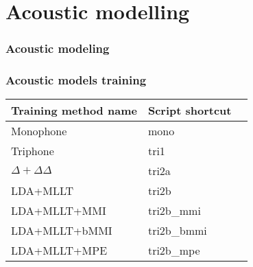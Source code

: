 \section{Acoustic modelling} %

\begin{frame}\frametitle{Acoustic modeling} 
    
\end{frame}

\begin{frame}\frametitle{Acoustic models training} 
    \begin{center}
        
        \small{\begin{tabular}{lll}
        \hline
        Training method name & Script shortcut \\
        \hline
        Monophone & mono \\
        Triphone  & tri1 \\
        $\Delta + \Delta\Delta$ & tri2a  \\
        LDA+MLLT & tri2b  \\
        LDA+MLLT+MMI & tri2b\_mmi \\
        LDA+MLLT+bMMI & tri2b\_bmmi \\
        LDA+MLLT+MPE & tri2b\_mpe \\
        \hline
        \end{tabular}}
    \end{center}
\end{frame}

